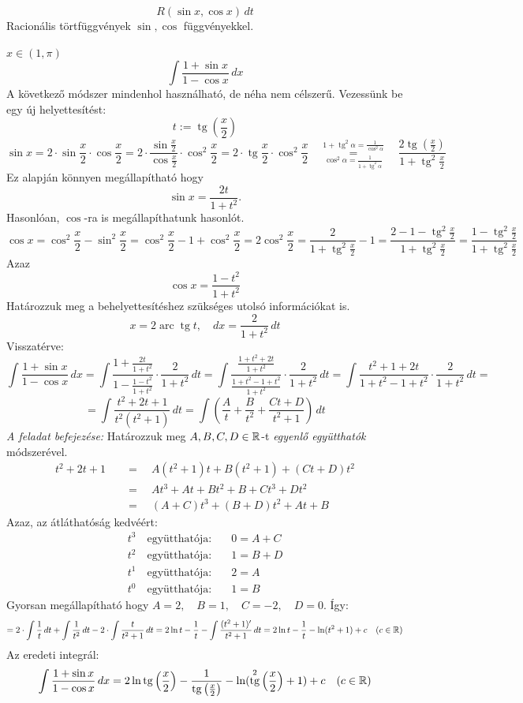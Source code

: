 \documentclass[a4paper,11.5pt]{article}
\DeclareMathOperator{\tg}{tg}
\DeclareMathOperator{\arc}{arc}
\begin{document}
	\begin{example}
		\[ R\left(\sin x,\cos x\right)\,dt \]
		Racionális törtfüggvények $\sin, \cos$ függvényekkel.
	\end{example}
	\begin{exercise}$x\in\left(1,\pi\right)$
		\[ \int\frac{1+\sin x}{1-\cos x}\,dx \]
		A következő módszer mindenhol használható, de néha nem célszerű. Vezessünk be egy új helyettesítést:
		\[  t:=\tg \left(\frac{x}{2}\right) \]
		\[ \sin x=2\cdot\sin\frac{x}{2}\cdot\cos\frac{x}{2}=2\cdot\frac{\sin\frac{x}{2}}{\cos\frac{x}{2}}\cdot\cos^2\frac{x}{2}=2\cdot\tg\frac{x}{2}\cdot\cos^2\frac{x}{2}\quad \overset{1+\tg^2\alpha=\frac{1}{\cos^2\alpha}}{\underset{\cos^2\alpha=\frac{1}{1+\tg^2\alpha}}{=}}\quad \frac{2\tg\left(\frac{x}{2}\right)}{1+\tg^2\frac{x}{2}} \]
		Ez alapján könnyen megállapítható hogy
		\[ \sin x=\frac{2t}{1+t^2}.  \]
		Hasonlóan, $\cos$-ra is megállapíthatunk hasonlót.
		\[ \cos x=\cos^2\frac{x}{2}-\sin^2\frac{x}{2}=\cos^2\frac{x}{2}-1+\cos^2\frac{x}{2}=2\cos^2\frac{x}{2}=\frac{2}{1+\tg^2\frac{x}{2}}-1=\frac{2-1-\tg^2\frac{x}{2}}{1+\tg^2\frac{x}{2}}=\frac{1-\tg^2\frac{x}{2}}{1+\tg^2\frac{x}{2}} \]
		Azaz
		\[ \cos x=\frac{1-t^2}{1+t^2} \]
		Határozzuk meg a behelyettesítéshez szükséges utolsó információkat is.
		\[ x=2\arc\tg t,\quad dx=\frac{2}{1+t^2}\,dt \]
		Visszatérve:
		\[ \int\frac{1+\sin x}{1-\cos x}\,dx=\int\frac{1+\frac{2t}{1+t^2}}{1-\frac{1-t^2}{1+t^2}}\cdot\frac{2}{1+t^2}\,dt=\int\frac{\frac{1+t^2+2t}{1+t^2}}{\frac{1+t^2-1+t^2}{1+t^2}}\cdot\frac{2}{1+t^2}\,dt=\int\frac{t^2+1+2t}{1+t^2-1+t^2}\cdot\frac{2}{1+t^2}\,dt=\]
		\[=\int\frac{t^2+2t+1}{t^2(t^2+1)}\,dt=\int\left(\frac{A}{t}+\frac{B}{t^2}+\frac{Ct+D}{t^2+1}\right)\,dt  \] 
		\textit{A feladat befejezése:} Határozzuk meg $A,B,C,D\in\mathbb{R}$-t \textit{egyenlő együtthatók} módszerével.
		\begin{align*}
			t^2+2t+1\quad &=\quad A(t^2+1)t+B(t^2+1)+(Ct+D)t^2\\
						  &=\quad At^3+At+Bt^2+B+Ct^3+Dt^2\\
						  &=\quad (A+C)t^3+(B+D)t^2+At+B
		\end{align*}
		Azaz, az átláthatóság kedvéért:
		\begin{align*}
			t^3 \quad \text{együtthatója:}&\quad  0=A+C\\
			t^2 \quad \text{együtthatója:}&\quad  1=B+D\\
			t^1 \quad \text{együtthatója:}&\quad  2=A\\
			t^0 \quad \text{együtthatója:}&\quad  1=B
		\end{align*}
		Gyorsan megállapítható hogy $A=2,\quad B=1,\quad C=-2,\quad D=0$. Így:
		\[ =2\cdot\int\frac{1}{t}\,dt+\int\frac{1}{t^2}\,dt-2\cdot\int\frac{t}{t^2+1}\,dt=2\ln t-\frac{1}{t}-\int\frac{(t^2+1)'}{t^2+1}\,dt=2\ln t-\frac{1}{t}-\ln(t^2+1)+c\quad (c\in\mathbb{R}) \]
		Az eredeti integrál:
		\[ \int\frac{1+\sin x}{1-\cos x}\,dx=2\ln \tg \left(\frac{x}{2}\right)-\frac{1}{\tg \left(\frac{x}{2}\right)}-\ln(\tg^2\left(\frac{x}{2}\right)+1)+c\quad (c\in\R) \]
	\end{exercise}
\end{document}
